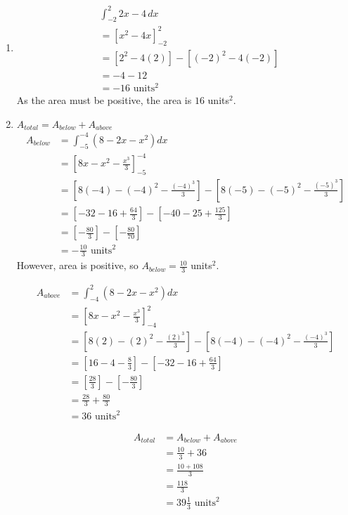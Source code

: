 \begin{enumerate}
	\item
	\begin{align*}
		&\int_{-2}^{2} 2x-4 \, dx\\
		&=\left[ x^2-4x \right]_{-2}^2\\
		&=\left[ 2^2-4\left(2\right) \right] - \left[ \left(-2\right)^2-4\left(-2\right) \right]\\
		&=-4-12\\
		&=-16 \text{ units}^2
	\end{align*}
	As the area must be positive, the area is $16$ units$^2$.
	
	\item
	$A_{total} = A_{below} + A_{above}$
	\begin{align*}
		A_{below} &= \int_{-5}^{-4} (8-2x-x^2) dx\\
		&= \left[ 8x-x^2-\frac{x^3}{3} \right]_{-5}^{-4}\\
		&= \left[ 8\left(-4\right) - \left(-4\right)^2 - \frac{(-4)^3}{3} \right] - \left[ 8\left(-5\right) - \left(-5\right)^2 - \frac{(-5)^3}{3} \right]\\
		&= \left[ -32-16 + \frac{64}{3} \right] - \left[ -40-25 + \frac{125}{3} \right]\\
		&= \left[ -\frac{80}{3} \right] - \left[ -\frac{80}{70}\right]\\
		&= -\frac{10}{3} \text{ units}^2
	\end{align*}
	However, area is positive, so $A_{below} = \frac{10}{3}$ units$^2$.
	
	\begin{align*}
		A_{above} &= \int_{-4}^{2} (8-2x-x^2) dx\\
		&= \left[ 8x-x^2-\frac{x^3}{3} \right]_{-4}^{2}\\
		&= \left[ 8\left(2\right) - \left(2\right)^2 - \frac{(2)^3}{3} \right] - \left[ 8\left(-4\right) - \left(-4\right)^2 - \frac{(-4)^3}{3} \right]\\
		&= \left[ 16-4 - \frac{8}{3} \right] - \left[ -32-16 + \frac{64}{3} \right]\\
		&= \left[ \frac{28}{3} \right] - \left[ -\frac{80}{3}\right]\\
		&= \frac{28}{3} + \frac{80}{3}\\
		&= 36 \text{ units}^2
	\end{align*}
	
	\begin{align*}
		A_{total} &= A_{below} + A_{above}\\
		&= \frac{10}{3} + 36\\
		&= \frac{10+108}{3}\\
		&= \frac{118}{3}\\
		&= 39\frac{1}{3} \text{ units}^2
	\end{align*}
\end{enumerate}

